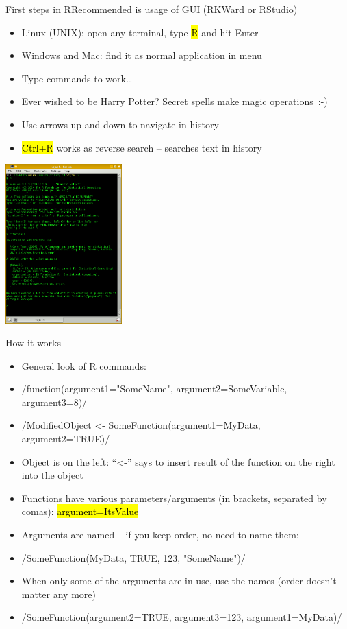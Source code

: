 \documentclass[compress, ucs, xelatex, 11pt, xcolor=svgnames,
  hyperref={
    bookmarks=true,
    unicode=true,
    colorlinks=true,
    pdftitle={Molecular data in R},
    plainpages=false,
    pdfauthor={Vojtech Zeisek},
    pdfsubject={Course about phylogeny and evolution in R},
    pdfcreator={XeLaTeX},
    pdfkeywords={R, evolution, phylogeny, molecular data},
    linkcolor=Tomato,
    anchorcolor=SaddleBrown,
    citecolor=Goldenrod,
    filecolor=DarkMagenta,
    menucolor=Sienna,
    urlcolor=DarkTurquoise,
    pdftex},
  url={hyphens, lowtilde} %
  ]{beamer}
\renewcommand{\texttt}[1]{\hl{\ttfamily #1}}
\begin{document}
\begin{frame}{First steps in R}{Recommended is usage of GUI (RKWard or RStudio)}
\begin{multicols}{2}
  \begin{itemize}
    \item Linux (UNIX): open any terminal, type \texttt{R} and hit Enter
    \item Windows and Mac: find it as normal application in menu
    \item Type commands to work\ldots
    \item \alert{Ever wished to be Harry Potter? Secret spells make magic operations~:-)}
    \item Use arrows up and down to navigate in history
    \item \texttt{Ctrl+R} works as reverse search -- searches text in history
  \end{itemize}
  \columnbreak
  \includegraphics[width=4.5cm]{rkonsole.png}
\end{multicols}
\end{frame}

\begin{frame}{How it works}
\begin{itemize}
 \item General look of R commands:
 \item \splus/function(argument1="SomeName", argument2=SomeVariable, argument3=8)/
 \item \splus/ModifiedObject <- SomeFunction(argument1=MyData, argument2=TRUE)/
 \item Object is on the left: ``<-'' says to insert result of the function on the right into the object
 \item Functions have various parameters/arguments (in brackets, separated by comas): \texttt{argument=ItsValue}
 \item Arguments are named -- if you keep order, no need to name them:
 \item \splus/SomeFunction(MyData, TRUE, 123, "SomeName")/
 \item When only some of the arguments are in use, use the names (order doesn't matter any more)
 \item \splus/SomeFunction(argument2=TRUE, argument3=123, argument1=MyData)/
\end{itemize}
\end{frame}
\end{document}
